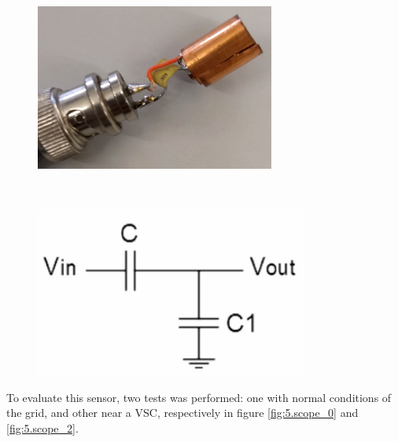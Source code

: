 	\begin{figure}[h!]
		\centering
		\begin{minipage}{.45\textwidth}
			\centering
			\includegraphics[width=0.7\textwidth,keepaspectratio]{figures/50.PreliminaryW/voltage_sensor}
			\label{fig:5.voltage_sensor}
		\end{minipage}%
		\begin{minipage}{.03\textwidth}  ~\end{minipage}	
		\begin{minipage}{.45\textwidth}
			\centering
			\includegraphics[width=0.8\textwidth,keepaspectratio]{figures/50.PreliminaryW/voltage_sensor_eq}
			\label{fig:5.voltage_sensor_eq}
		\end{minipage}
	\end{figure}

	
	To evaluate this sensor, two tests was performed: one with normal conditions of the grid, and other near a \ac{VSC}, respectively in figure \ref{fig:5.scope_0} and \ref{fig:5.scope_2}.
	
